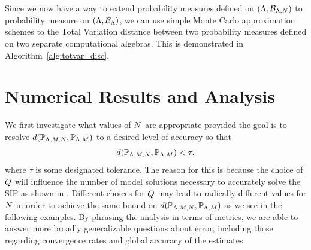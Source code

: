 Since we now have a way to extend probability measures defined on $({\Lambda}, \mathcal{B}_{{\Lambda}, N})$ to  probability measure on $({\Lambda}, \mathcal{B}_{{\Lambda}})$, we can use simple Monte Carlo approximation schemes to the Total Variation distance between two probability measures defined on two separate computational algebras.
This is demonstrated in Algorithm~\ref{alg:totvar_disc}.


%
\section{Numerical Results and Analysis}\label{sec:ch03-examples}
We first investigate what values of $N$ are appropriate provided the goal is to resolve $d(\mathbb{P}_{{\Lambda}, M, N}, \mathbb{P}_{{\Lambda}, M})$ to a desired level of accuracy so that
\begin{equation}\label{eq:newobjective}
d(\mathbb{P}_{{\Lambda}, M, N}, \mathbb{P}_{{\Lambda},M}) < \tau,
\end{equation}
where $\tau$ is some designated tolerance.
%
%
The reason for this is because the choice of $Q$ will influence the number of model solutions necessary to accurately solve the SIP as shown in \cite{BGE+15}.
Different choices for $Q$ may lead to radically different values for $N$ in order to achieve the same bound on $d(\mathbb{P}_{{\Lambda}, M, N}, \mathbb{P}_{{\Lambda}, M})$ as we see in the following examples.
By phrasing the analysis in terms of metrics, we are able to answer more broadly generalizable questions about error, including those regarding convergence rates and global accuracy of the estimates.






